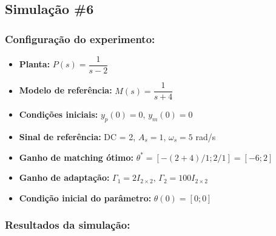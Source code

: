 \documentclass[10pt]{article}
\begin{document}
\newpage

\subsection{Simulação \#6}
\subsubsection{Configuração do experimento:}
\begin{itemize}
\item \textbf{Planta:} $P(s) = \dfrac{1}{s - 2}$
\item \textbf{Modelo de referência:} $M(s) = \dfrac{1}{s + 4}$
\item \textbf{Condições iniciais:} $y_p(0)=0$, $y_m(0)=0$
\item \textbf{Sinal de referência:} DC = 2, $A_s=1$, $\omega_s=5$ rad/s
\item \textbf{Ganho de matching ótimo:} $\theta^* = [-(2+4)/1;2/1] = [-6;2]$
\item \textbf{Ganho de adaptação:} $\Gamma_1 = 2I_{2\times2}$, $\Gamma_2 = 100I_{2\times2}$
\item \textbf{Condição inicial do parâmetro:} $\theta(0) = [0;0]$
\end{itemize}

\subsubsection{Resultados da simulação:}
\end{document}
